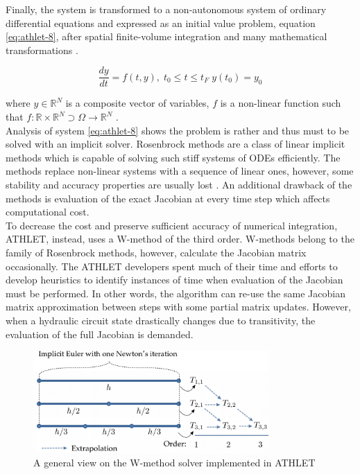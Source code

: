 Finally, the system is transformed to a non-autonomous system of ordinary differential equations and expressed as an initial value problem, equation \ref{eq:athlet-8}, after spatial finite-volume integration and many mathematical transformations \cite{lt:ATHLMaM}. 


\begin{equation} \label{eq:athlet-8}
	\frac{dy}{dt} = f(t,y), \;  t_{0} \leq t \leq t_{F} \; y(t_{0}) = y_{0}
\end{equation}

where $y \in \mathbb{R}^{N}$ is a composite vector of variables, $f$ is a non-linear function such that $f : \mathbb{R} \times \mathbb{R}^{N} \supset \Omega  \rightarrow \mathbb{R}^{N}$  .\\


Analysis of system \ref{eq:athlet-8} shows the problem is rather and thus must to be solved with an implicit solver. Rosenbrock methods are a class of linear implicit methods which is capable of solving such stiff systems of ODEs efficiently. The methods replace non-linear systems with a sequence of linear ones, however, some stability and accuracy properties are usually lost \cite{blom2013rosenbrock}. An additional drawback of the methods is evaluation of the exact Jacobian at every time step which affects computational cost.\\


To decrease the cost and preserve sufficient accuracy of numerical integration, ATHLET, instead, uses a W-method of the third order. W-methods belong to the family of Rosenbrock methods, however, calculate the Jacobian matrix occasionally. The ATHLET developers spent much of their time and efforts to develop heuristics to identify instances of time when evaluation of the Jacobian must be performed. In other words, the algorithm can re-use the same Jacobian matrix approximation between steps with some partial matrix updates. However, when a hydraulic circuit state drastically changes due to transitivity, the evaluation of the full Jacobian is demanded.\\


\figpointer{\ref{fig:introduction-w-method-scheme}}
\begin{figure}[htpb]
  \centering
  \includegraphics[width=0.8\textwidth]{figures/introduction-rosenbrock-scheme.png}
\caption{A general view on the W-method solver implemented in ATHLET}
\label{fig:introduction-w-method-scheme}
\end{figure}


